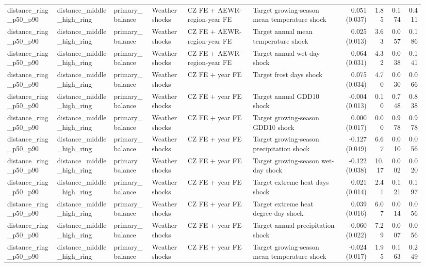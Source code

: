 \begin{tabular}{llllllrrrr}
distance_ring_p50_p90 & distance_middle_high_ring & primary_balance & Weather shocks & CZ FE + AEWR-region-year FE & Target growing-season mean temperature shock & 0.051 (0.037) & 1.85 & 0.174 & 0.411 \\
distance_ring_p50_p90 & distance_middle_high_ring & primary_balance & Weather shocks & CZ FE + AEWR-region-year FE & Target annual mean temperature shock & 0.025 (0.013) & 3.63 & 0.057 & 0.186 \\
distance_ring_p50_p90 & distance_middle_high_ring & primary_balance & Weather shocks & CZ FE + AEWR-region-year FE & Target annual wet-day shock & -0.064 (0.031) & 4.32 & 0.038 & 0.141 \\
distance_ring_p50_p90 & distance_middle_high_ring & primary_balance & Weather shocks & CZ FE + year FE & Target frost days shock & 0.075 (0.034) & 4.70 & 0.030 & 0.066 \\
distance_ring_p50_p90 & distance_middle_high_ring & primary_balance & Weather shocks & CZ FE + year FE & Target annual GDD10 shock & -0.004 (0.013) & 0.10 & 0.748 & 0.838 \\
distance_ring_p50_p90 & distance_middle_high_ring & primary_balance & Weather shocks & CZ FE + year FE & Target growing-season GDD10 shock & 0.000 (0.017) & 0.00 & 0.978 & 0.978 \\
distance_ring_p50_p90 & distance_middle_high_ring & primary_balance & Weather shocks & CZ FE + year FE & Target growing-season precipitation shock & -0.127 (0.049) & 6.67 & 0.010 & 0.056 \\
distance_ring_p50_p90 & distance_middle_high_ring & primary_balance & Weather shocks & CZ FE + year FE & Target growing-season wet-day shock & -0.122 (0.038) & 10.17 & 0.002 & 0.020 \\
distance_ring_p50_p90 & distance_middle_high_ring & primary_balance & Weather shocks & CZ FE + year FE & Target extreme heat days shock & 0.021 (0.014) & 2.41 & 0.121 & 0.197 \\
distance_ring_p50_p90 & distance_middle_high_ring & primary_balance & Weather shocks & CZ FE + year FE & Target extreme heat degree-day shock & 0.039 (0.016) & 6.07 & 0.014 & 0.056 \\
distance_ring_p50_p90 & distance_middle_high_ring & primary_balance & Weather shocks & CZ FE + year FE & Target annual precipitation shock & -0.060 (0.022) & 7.29 & 0.007 & 0.056 \\
distance_ring_p50_p90 & distance_middle_high_ring & primary_balance & Weather shocks & CZ FE + year FE & Target growing-season mean temperature shock & -0.024 (0.017) & 1.95 & 0.163 & 0.249 \\

\end{tabular}
